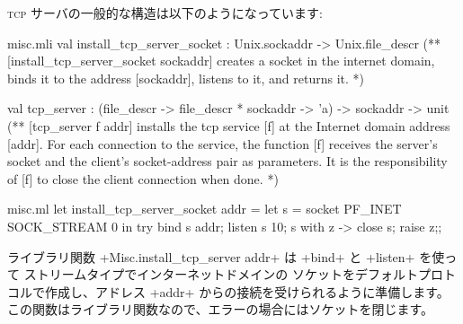 \textsc{tcp} サーバの一般的な構造は以下のようになっています:
%
\begin{codefile}{misc.mli}
val install_tcp_server_socket : Unix.sockaddr -> Unix.file_descr
(** [install_tcp_server_socket sockaddr] creates a socket in the internet
 domain,  binds it to the address [sockaddr], listens to it, and returns
it. *)

val tcp_server :
 (file_descr -> file_descr * sockaddr -> 'a) -> sockaddr -> unit
(** [tcp_server f addr] installs the tcp service [f] at the Internet domain
   address  [addr]. For each connection to the service, the
   function [f] receives the server's socket and the client's
   socket-address pair as parameters. It is the responsibility of  [f] to
   close the client connection when done. *)
\end{codefile}
%
\begin{listingcodefile}{misc.ml}
let install_tcp_server_socket addr =
  let s = socket PF_INET SOCK_STREAM 0 in
  try
    bind s addr;
    listen s 10;
    s
  with z -> close s; raise z;;
\end{listingcodefile}
ライブラリ関数 \ml+Misc.install_tcp_server addr+ は \ml+bind+ と \ml+listen+ を使って
ストリームタイプでインターネットドメインの
ソケットをデフォルトプロトコルで作成し、アドレス \ml+addr+ からの接続を受けられるように準備します。
この関数はライブラリ関数なので、エラーの場合にはソケットを閉じます。


